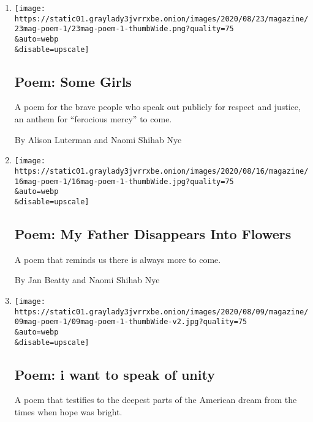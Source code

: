 \begin{enumerate}
\def\labelenumi{\arabic{enumi}.}
\item
  \href{/2020/08/20/magazine/poem-some-girls.html}{}

  \texttt{[image: https://static01.graylady3jvrrxbe.onion/images/2020/08/23/magazine/23mag-poem-1/23mag-poem-1-thumbWide.png?quality=75\\\&auto=webp\\\&disable=upscale]}

  \hypertarget{poem-some-girls}{%
  \subsection{Poem: Some Girls}\label{poem-some-girls}}

  A poem for the brave people who speak out publicly for respect and
  justice, an anthem for ``ferocious mercy'' to come.

  By Alison Luterman and Naomi Shihab Nye
\item
  \href{/2020/08/13/magazine/poem-my-father-disappears-into-flowers.html}{}

  \texttt{[image: https://static01.graylady3jvrrxbe.onion/images/2020/08/16/magazine/16mag-poem-1/16mag-poem-1-thumbWide.jpg?quality=75\\\&auto=webp\\\&disable=upscale]}

  \hypertarget{poem-my-father-disappears-into-flowers}{%
  \subsection{Poem: My Father Disappears Into
  Flowers}\label{poem-my-father-disappears-into-flowers}}

  A poem that reminds us there is always more to come.

  By Jan Beatty and Naomi Shihab Nye
\item
  \href{/2020/08/06/magazine/poem-i-want-to-speak-of-unity.html}{}

  \texttt{[image: https://static01.graylady3jvrrxbe.onion/images/2020/08/09/magazine/09mag-poem-1/09mag-poem-1-thumbWide-v2.jpg?quality=75\\\&auto=webp\\\&disable=upscale]}

  \hypertarget{poem-i-want-to-speak-of-unity}{%
  \subsection{Poem: i want to speak of
  unity}\label{poem-i-want-to-speak-of-unity}}

  A poem that testifies to the deepest parts of the American dream from
  the times when hope was bright.


\end{enumerate}
